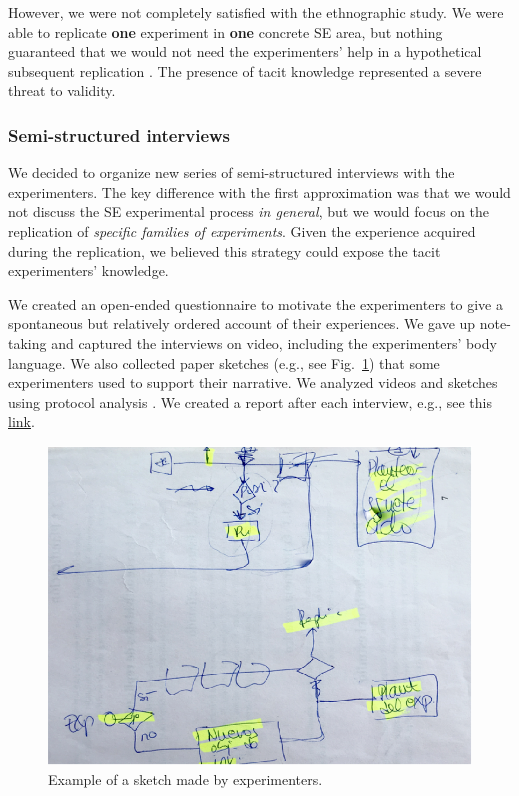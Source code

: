 However, we were not completely satisfied with the ethnographic study. We were able to replicate \textbf{one} experiment in \textbf{one} concrete SE area, but nothing guaranteed that we would not need the experimenters' help in a hypothetical subsequent replication \cite{Juristo-2012-replication-SE} \cite{Gomez-2014-understanding-replication}. The presence of tacit knowledge represented a severe threat to validity.

\subsubsection{Semi-structured interviews}
We decided to organize new series of semi-structured interviews with the experimenters. The key difference with the first approximation was that we would not discuss the SE experimental process \textit{in general}, but we would focus on the replication of \textit{specific families of experiments}. Given the experience acquired during the replication, we believed this strategy could expose the tacit experimenters' knowledge.

We created an open-ended questionnaire to motivate the experimenters to give a spontaneous but relatively ordered account of their experiences. We gave up note-taking and captured the interviews on video, including the experimenters' body language. We also collected paper sketches (e.g., see Fig.~\ref{fig-proceso-exp-boseto}) that some experimenters used to support their narrative. We analyzed videos and sketches using protocol analysis \cite{Pressley-1995-verbal-protocols}. We created a report after each interview, e.g., see this \href{https://zenodo.org/record/7102137#.YytgDOzMLUI}{\ul{link}}.

\begin{figure}[htbp!]
	\centering
	\includegraphics[width=\columnwidth]{images/Boseto-Proccess}
	\caption{Example of a sketch made by experimenters.}
	\label{fig-proceso-exp-boseto}
\end{figure}


